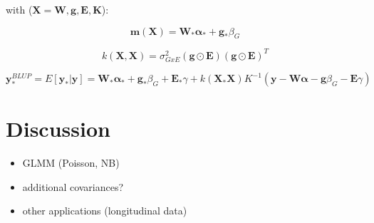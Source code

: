 with ($\mathbf{X} = {\mathbf{W},\mathbf{g},\mathbf{E},\mathbf{K}}$):

\begin{equation}
    \mathbf{m}(\mathbf{X}) = \mathbf{W}_*\boldsymbol{\alpha}_{*}+\mathbf{g}_*\beta_G
\end{equation}

\begin{equation}
    k(\mathbf{X},\mathbf{X}) = \sigma_{GxE}^2(\mathbf{g}\odot\mathbf{E})(\mathbf{g}\odot\mathbf{E})^T
\end{equation}

\begin{equation}
\mathbf{y}_{*}^{BLUP} = E[\mathbf{y}_*|\mathbf{y}] = 
\mathbf{W}_*\boldsymbol{\alpha}_{*}+\mathbf{g}_*\beta_G+\mathbf{E}_*\gamma + 
k(\mathbf{X}_*\mathbf{X})K^{-1}(\mathbf{y}-\mathbf{W}\boldsymbol{\alpha}-\mathbf{g}\beta_G-\mathbf{E}\gamma)
\end{equation}

\section{Discussion}

\begin{itemize}
    \item GLMM (Poisson, NB)
    \item additional covariances?
    \item other applications (longitudinal data)
\end{itemize}
